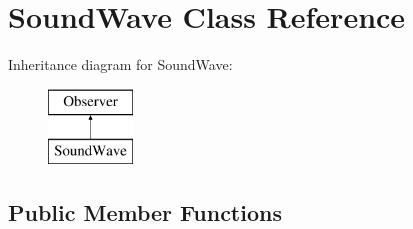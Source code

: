\hypertarget{classSoundWave}{}\section{Sound\+Wave Class Reference}
\label{classSoundWave}
Inheritance diagram for Sound\+Wave\+:\begin{figure}[H]
\begin{center}
\leavevmode
\includegraphics[height=2.000000cm]{classSoundWave}
\end{center}
\end{figure}
\subsection*{Public Member Functions}

